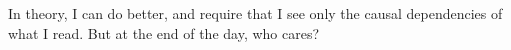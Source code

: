 \ac{In theory, I can do better, and require that I see only the causal dependencies 
of what I read. But at the end of the day, who cares?}

%

